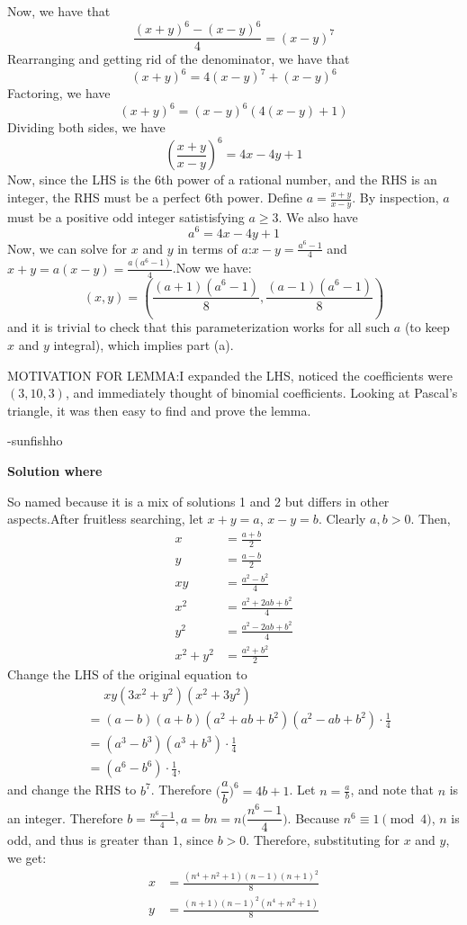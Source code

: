 \begin{enumerate}
 
Now, we have that 
 \[\frac{(x+y)^6-(x-y)^6}{4}=(x-y)^7\]Rearranging and getting rid of the denominator, we have that 
 \[(x+y)^6=4(x-y)^7+(x-y)^6\]Factoring, we have 
 \[(x+y)^6=(x-y)^6(4(x-y)+1)\]Dividing both sides, we have 
 \[\left(\frac{x+y}{x-y}\right)^6=4x-4y+1\]Now, since the LHS is the 6th power of a rational number, and the RHS is an integer, the RHS must be a perfect 6th power. Define $a=\frac{x+y}{x-y}$. By inspection, $a$ must be a positive odd integer satistisfying $a \geq 3$. We also have 
 \[a^6=4x-4y+1\] Now, we can solve for $x$ and $y$ in terms of $a$:$x-y=\frac{a^6-1}{4}$ and $x+y=a(x-y)=\frac{a(a^6-1)}{4}$.Now we have: 
 \[(x,y)=\left(\frac{(a+1)(a^6-1)}{8},\frac{(a-1)(a^6-1)}{8}\right)\]and it is trivial to check that this parameterization works for all such $a$ (to keep $x$ and $y$ integral), which implies part (a).

 
MOTIVATION FOR LEMMA:I expanded the LHS, noticed the coefficients were $(3,10,3)$, and immediately thought of binomial coefficients. Looking at Pascal's triangle, it was then easy to find and prove the lemma.

 -sunfishho

 



\textbf{Solution  where }

So named because it is a mix of solutions 1 and 2 but differs in other aspects.After fruitless searching, let $x+y=a$, $x-y=b$. Clearly $a,b>0$. Then,
 \begin{align*} x&=\frac{a+b}{2}\\ y&=\frac{a-b}{2}\\ xy&=\frac{a^2-b^2}{4}\\ x^2&=\frac{a^2+2ab+b^2}{4}\\ y^2&=\frac{a^2-2ab+b^2}{4}\\ x^2+y^2&=\frac{a^2+b^2}{2} \end{align*}
Change the LHS of the original equation to
 \begin{align*} &\mathrel{\phantom{=}}xy(3x^2+y^2)(x^2+3y^2)\\ &=(a-b)(a+b)(a^2+ab+b^2)(a^2-ab+b^2)\cdot\frac{1}{4}\\ &=(a^3-b^3)(a^3+b^3)\cdot\frac{1}{4}\\ &=(a^6-b^6)\cdot\frac{1}{4}, \end{align*}
and change the RHS to $b^7$. Therefore $\biggl(\dfrac{a}{b}\biggr)^6=4b+1$. Let $n=\frac{a}{b}$, and note that $n$ is an integer. Therefore $b=\frac{n^6-1}{4},a=bn=n\biggl(\dfrac{n^6-1}{4}\biggr)$. Because $n^6\equiv1\pmod{4}$, $n$ is odd, and thus is greater than $1$, since $b>0$. Therefore, substituting for $x$ and $y$, we get:
 \begin{align*} x&=\frac{(n^4+n^2+1)(n-1)(n+1)^2}{8}\\ y&=\frac{(n+1)(n-1)^2(n^4+n^2+1)}{8} \end{align*}



\end{enumerate}
